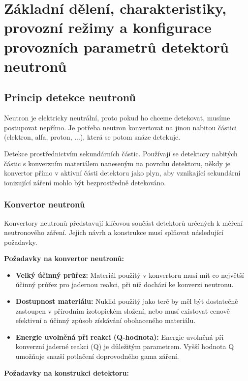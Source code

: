 \section[Režimy a provoz neutronových detektorů]{Základní dělení, charakteristiky, provozní režimy a konfigurace provozních parametrů detektorů neutronů}

\subsection{Princip detekce neutronů}

Neutron je elektricky neutrální, proto pokud ho chceme detekovat, musíme postupovat nepřímo. Je potřeba neutron konvertovat na jinou nabitou částici (elektron, alfa, proton, ...), která se potom snáze detekuje. 

Detekce prostřednictvím sekundárních částic. Používají se detektory nabitých částic s konverzním materiálem naneseným na povrchu detektoru, někdy je konvertor přímo v aktivní části detektoru jako plyn, aby vznikající sekundární ionizující záření mohlo být bezprostředně detekováno. 

\subsubsection{Konvertor neutronů}

Konvertory neutronů představují klíčovou součást detektorů určených k měření neutronového záření. Jejich návrh a konstrukce musí splňovat následující požadavky.

\textbf{Požadavky na konvertor neutronů:}

\begin{itemize}
    \item \textbf{Velký účinný průřez:} Materiál použitý v konvertoru musí mít co největší účinný průřez pro jadernou reakci, při níž dochází ke konverzi neutronu.
    \item  \textbf{Dostupnost materiálu:} Nuklid použitý jako terč by měl být dostatečně zastoupen v přírodním izotopickém složení, nebo musí existovat cenově efektivní a účinný způsob získávání obohaceného materiálu.
    \item  \textbf{Energie uvolněná při reakci (Q-hodnota):} Energie uvolněná při konverzní jaderné reakci (Q) je důležitým parametrem. Vyšší hodnota Q umožňuje snazší potlačení doprovodného gama záření.
\end{itemize}

\textbf{Požadavky na konstrukci detektoru:}

